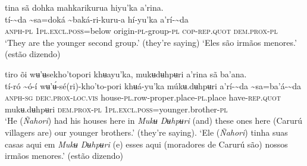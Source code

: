 \documentclass[output=paper,
modfonts,nonflat
]{langsci/langscibook}
\begin{document}
\ea tina sã dohka mahkarikurua hiyu'ka a’rina. \\[.3em]
\gll tí-{\textasciitilde}da	{\textasciitilde}sa=doká	{\textasciitilde}baká-ri-kuru-a	hí-yu'ka	a’rí-{\textasciitilde}da \\
     \textsc{anph-pl}	1\textsc{pl.excl.poss}=below	origin-\textsc{pl}-group-\textsc{pl}	\textsc{cop-rep.quot}	\textsc{dem.prox-pl} \\
\glt ‘They are the younger second group.’ (they’re saying){\footnotemark}
\glt ‘Eles são irmãos menores.’ (estão dizendo)
\z 

\newpage 
\ea tiro õi wʉ'ʉsekho'topori khʉayu'ka, mukʉdʉhpʉri a’rina sã ba'ana. \\[.3em]
\gll tí-ró	{\textasciitilde}ó-í	wʉ'ʉ́-sé(ri)-kho'to-pori	khʉá-yu'ka múkʉ.dʉhpʉri	a’rí-{\textasciitilde}da	{\textasciitilde}sa=ba'á-{\textasciitilde}da \\
     \textsc{anph-sg}	\textsc{deic.prox-loc.vis}	house-\textsc{pl.}row-proper.place-\textsc{pl}.place	have-\textsc{rep.quot} mukʉ.dʉhpʉri	\textsc{dem.prox-pl}	1\textsc{pl.excl.poss}=younger.brother-\textsc{pl} \\
\glt ‘He (\textit{Ñahori}) had his houses here in \textit{Mukʉ Dʉhpʉri} (and) these ones here (Carurú villagers are) our younger brothers.’ (they’re saying). 
\glt ‘Ele (\textit{Ñahori}) tinha suas casas aqui em \textit{Mukʉ Dʉhpʉri} (e) esses aqui (moradores de Carurú são) nossos irmãos menores.’ (estão dizendo)
\z 
\end{document}
